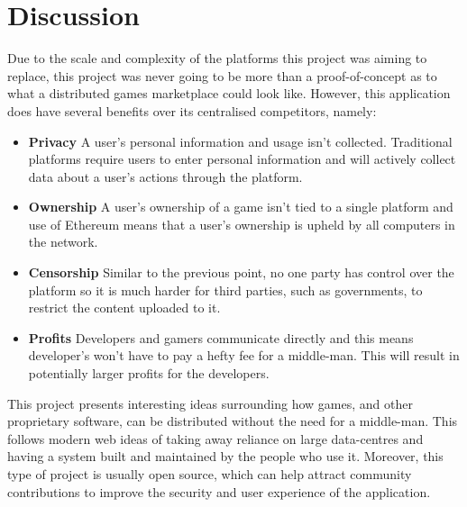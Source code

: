 \section{Discussion}

Due to the scale and complexity of the platforms this project was aiming to replace, this project was never going to be more than a proof-of-concept as to what a distributed games marketplace could look like. 
However, this application does have several benefits over its centralised competitors, namely:

\begin{itemize}
  \item \textbf{Privacy} A user's personal information and usage isn't collected. Traditional platforms require users to enter personal information and will actively collect data about a user's actions through the platform.
  \item \textbf{Ownership} A user's ownership of a game isn't tied to a single platform and use of Ethereum means that a user's ownership is upheld by all computers in the network.
  \item \textbf{Censorship} Similar to the previous point, no one party has control over the platform so it is much harder for third parties, such as governments, to restrict the content uploaded to it.
  \item \textbf{Profits} Developers and gamers communicate directly and this means developer's won't have to pay a hefty fee for a middle-man. This will result in potentially larger profits for the developers.  
\end{itemize}

\vspace{2mm}\noindent
This project presents interesting ideas surrounding how games, and other proprietary software, can be distributed without the need for a middle-man. This follows modern web ideas of taking away reliance on large data-centres and having a system built and maintained by the people who use it. Moreover, this type of project is usually open source, which can help attract community contributions to improve the security and user experience of the application.
